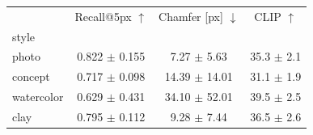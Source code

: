 \begin{tabular}{lccc}
\toprule
 & Recall@5px $\uparrow$ & Chamfer [px] $\downarrow$ & CLIP $\uparrow$ \\
style &  &  &  \\
\midrule
photo & 0.822 $\pm$ 0.155 & 7.27 $\pm$ 5.63 & 35.3 $\pm$ 2.1 \\
concept & 0.717 $\pm$ 0.098 & 14.39 $\pm$ 14.01 & 31.1 $\pm$ 1.9 \\
watercolor & 0.629 $\pm$ 0.431 & 34.10 $\pm$ 52.01 & 39.5 $\pm$ 2.5 \\
clay & 0.795 $\pm$ 0.112 & 9.28 $\pm$ 7.44 & 36.5 $\pm$ 2.6 \\
\bottomrule
\end{tabular}
